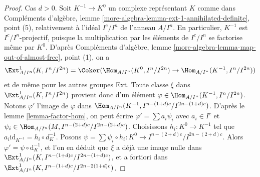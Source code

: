 \begin{proof}
Cas $d > 0$. Soit $K^{-1} \to K^0$ un complexe représentant $K$ comme dans Compléments d'algèbre, lemme \ref{more-algebra-lemma-ext-1-annihilated-definite}, point (5), relativement à l'idéal $I^c/I^n$ de l'anneau $A/I^n$. En particulier, $K^{-1}$ est $I^c/I^n$-projectif, puisque la multiplication par les éléments de $I^c/I^n$ se factorise même par $K^0$. D'après Compléments d'algèbre, lemme \ref{more-algebra-lemma-map-out-of-almost-free}, point (1), on a
$$
\Ext^1_{A/I^n}(K, I^n/I^{2n}) =
\Coker(\Hom_{A/I^n}(K^0, I^n/I^{2n}) \to \Hom_{A/I^n}(K^{-1}, I^n/I^{2n}))
$$
et de même pour les autres groupes Ext. Toute classe $\xi$ dans $\Ext^1_{A/I^n}(K, I^n/I^{2n})$ provient donc d'un élément $\varphi \in \Hom_{A/I^n}(K^{-1}, I^n/I^{2n})$. Notons $\varphi'$ l'image de $\varphi$ dans $\Hom_{A/I^n}(K^{-1}, I^{n - (1 + d)c}/I^{2n - (1 + d)c})$. D'après le lemme \ref{lemma-factor-hom}, on peut écrire $\varphi' = \sum a_i \psi_i$ avec $a_i \in I^c$ et $\psi_i \in \Hom_{A/I^n}(M, I^{n - (2 + d)c}/I^{2n - (2 + d)c})$. Choisissons $h_i : K^0 \to K^{-1}$ tel que $a_i \text{id}_{K^{-1}} = h_i \circ d_K^{-1}$. Posons $\psi = \sum \psi_i \circ h_i : K^0 \to I^{n - (2 + d)c}/I^{2n - (2 + d)c}$. Alors $\varphi' = \psi \circ \text{d}_K^{-1}$, et l'on en déduit que $\xi$ a déjà une image nulle dans $\Ext^1_{A/I^n}(K, I^{n - (1 + d)c}/I^{2n - (1 + d)c})$, et a fortiori dans $\Ext^1_{A/I^n}(K, I^{n - (1 + d)c}/I^{2n - 2(1 + d)c})$.



\end{proof}
